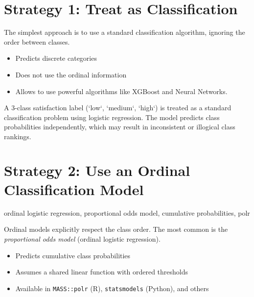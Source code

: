 \documentclass[12pt,openany, draft]{book}
\begin{document}
\vspace{10pt}



\section{Strategy 1: Treat as Classification}

The simplest approach is to use a standard classification algorithm, ignoring
the order between classes.

\begin{itemize}
    \item Predicts discrete categories
    \item Does not use the ordinal information
    \item Allows to use powerful algorithms like XGBoost and Neural Networks.
\end{itemize}

\begin{examplebox}
A 3-class satisfaction label (`low`, `medium`, `high`) is treated as a
standard classification problem using logistic regression. The model
predicts class probabilities independently, which may result in
inconsistent or illogical class rankings.
\end{examplebox}

\vspace{5pt}



\section{Strategy 2: Use an Ordinal Classification Model}

\begin{keywordsbox}
ordinal logistic regression, proportional odds model, cumulative probabilities, polr
\end{keywordsbox}

Ordinal models explicitly respect the class order. The most common is
the \textit{proportional odds model} (ordinal logistic regression).

\begin{itemize}
    \item Predicts cumulative class probabilities
    \item Assumes a shared linear function with ordered thresholds
    \item Available in \texttt{MASS::polr} (R), 
          \texttt{statsmodels} (Python), and others
\end{itemize}
\end{document}
